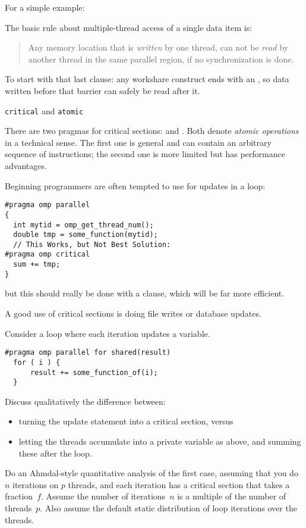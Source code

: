 For a simple example:

The basic rule about multiple-thread access of a single data item is:
\begin{quote}
  Any memory location that is \emph{written} by one thread, can not be
  \emph{read} by another thread in the same parallel region, if no
  synchronization is done.
\end{quote}

To start with that last clause: any workshare construct ends with an
, so data written before that barrier
can safely be read after it.

 {\texttt{critical} and \texttt{atomic}}
\label{sec:critical}

There are two pragmas for critical sections:  and .
Both denote \emph{atomic operations}
in a technical sense.
The first one is general and can contain an arbitrary sequence of instructions;
the second one is more limited but has performance advantages.

Beginning programmers are often tempted to use 
for updates in a loop:
\begin{lstlisting}
#pragma omp parallel
{
  int mytid = omp_get_thread_num();
  double tmp = some_function(mytid);
  // This Works, but Not Best Solution:
#pragma omp critical
  sum += tmp;
}
\end{lstlisting}
but this should really be done with a  clause,
which will be far more efficient.

A good use of critical sections is doing file writes or database updates.

\begin{exercise}
  Consider  a loop where each iteration updates a variable.
\begin{lstlisting}
#pragma omp parallel for shared(result)
  for ( i ) {
      result += some_function_of(i);
  }
\end{lstlisting}
  Discuss qualitatively
  the difference between:
  \begin{itemize}
  \item  turning the update statement into a critical section, versus
  \item letting the threads accumulate into a private variable  as above,
    and summing these after the loop.
  \end{itemize}  
  Do an Ahmdal-style quantitative analysis of the first case, assuming
  that you do $n$ iterations on $p$ threads, and each iteration has a
  critical section that takes a fraction~$f$.  Assume the number of
  iterations~$n$ is a multiple of the number of threads~$p$. Also
  assume the default static distribution of loop iterations over the
  threads.
\end{exercise}

